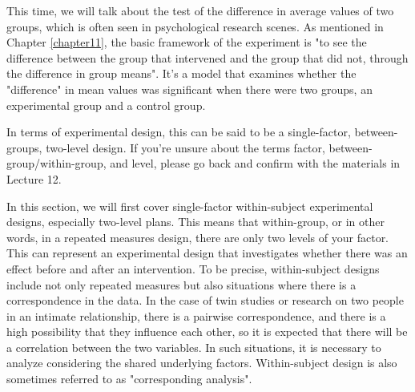 \documentclass{ltjsarticle}
\begin{document}
This time, we will talk about the test of the difference in average values of two groups, which is often seen in psychological research scenes.
As mentioned in Chapter \ref{chapter11}, the basic framework of the experiment is "to see the difference between the group that intervened and the group that did not, through the difference in group means". It's a model that examines whether the "difference" in mean values was significant when there were two groups, an experimental group and a control group.

In terms of experimental design, this can be said to be a single-factor, between-groups, two-level design. If you're unsure about the terms factor, between-group/within-group, and level, please go back and confirm with the materials in Lecture 12.

In this section, we will first cover single-factor within-subject experimental designs, especially two-level plans. This means that within-group, or in other words, in a repeated measures design, there are only two levels of your factor. This can represent an experimental design that investigates whether there was an effect before and after an intervention. To be precise, within-subject designs include not only repeated measures but also situations where there is a correspondence in the data. In the case of twin studies or research on two people in an intimate relationship, there is a pairwise correspondence, and there is a high possibility that they influence each other, so it is expected that there will be a correlation between the two variables. In such situations, it is necessary to analyze considering the shared underlying factors. Within-subject design is also sometimes referred to as "corresponding analysis".
\end{document}
